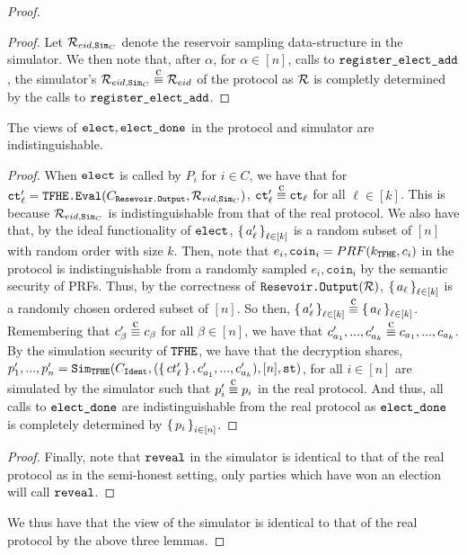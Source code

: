 \begin{theorem}
\begin{proof}
\begin{lemma}
\begin{proof}
				Let $\mathcal{R}_{{eid}, \texttt{Sim}_C}$ denote the reservoir sampling data-structure in the simulator.
				We then note that, after $\alpha$, for $\alpha \in [n]$,  calls to $\texttt{register\_elect\_add}$, the simulator's $\resSampling_{\eid, \simCMSLE} \compInd \resSampling_\eid$
				of the protocol as $\mathcal{R}$ is completly determined by the calls to $\texttt{register\_elect\_add}$.
			\end{proof}
		\end{lemma}
		\begin{lemma}
			The views of $\texttt{elect}, \texttt{elect\_done}$ in the protocol and simulator are indistinguishable.
			\begin{proof}
				When $\texttt{elect}$ is called by $P_i$ for $i \in C$, we have that for $\texttt{ct}'_\ell = \texttt{TFHE.Eval}(C_{\texttt{Resevoir.Output}}, \mathcal{R}_{{eid}, \texttt{Sim}_C})$, $\ct'_\ell \compInd \ct_\ell$ for all $\ell \in [k]$.
				This is because $\mathcal{R}_{{eid}, \texttt{Sim}_C}$ is indistinguishable from that of the real protocol.
				We also have that, by the ideal functionality of $\texttt{elect}$, $\set{a'_\ell}_{\ell \in [k]}$ is a random subset of $[n]$ with random order with size $k$.
				Then, note that $e_i, \texttt{coin}_i = PRF(k_{\texttt{TFHE}}, c_i)$ in the protocol is indistinguishable from a randomly sampled $e_i, \texttt{coin}_i$
				by the semantic security of PRFs. Thus, by the correctness of $\texttt{Resevoir.Output}(\mathcal{R})$, $\set{a_\ell}_{\ell \in [k]}$ is a randomly chosen ordered subset of $[n]$.
				So then, $\set{a'_\ell}_{\ell \in [k]} \compInd \set{a_\ell}_{\ell \in [k]}$.
				Remembering that $c'_\beta \compInd c_\beta$ for all $\beta \in [n]$, we have that $c'_{a_1}, ..., c'_{a_k} \compInd c_{a_1}, ..., c_{a_k}$.
				By the simulation security of ${\texttt{TFHE}}$, we have that the decryption shares, $p'_1,..., p'_n = \texttt{Sim}_{{\texttt{TFHE}}}(C_{\texttt{Ident}}, (\set{ct'_\ell}, c'_{a_1}, ..., c'_{a_k}), [n], \texttt{st})$, for all $i \in [n]$ are simulated by the simulator such that $p'_i \compInd p_i$ in the real protocol.
				And thus, all calls to $\texttt{elect\_done}$ are indistinguishable from the real protocol as $\texttt{elect\_done}$ is completely
				determined by $\set{p_i}_{i \in [n]}$.
			\end{proof}
		\end{lemma}
		\begin{lemma}
			\begin{proof}
				Finally, note that $\texttt{reveal}$ in the simulator is identical to that of the real protocol
				as in the semi-honest setting, only parties which have won an election will call $\texttt{reveal}$.
			\end{proof}
		\end{lemma}
		We thus have that the view of the simulator is identical to that of the real protocol by the above three lemmas.
	\end{proof}
\end{theorem}


